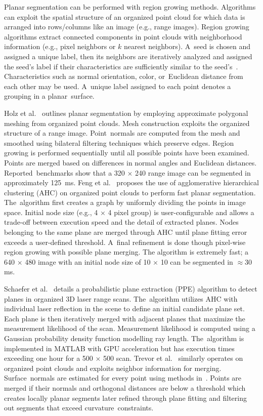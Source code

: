 Planar segmentation can be performed with region growing methods.  Algorithms can exploit the spatial structure of an organized point cloud for which data is arranged into rows/columns like an image (e.g., range images).  Region growing algorithms extract connected components in point clouds with neighborhood information (e.g., pixel neighbors or $k$ nearest neighbors). A~seed is chosen and assigned a unique label, then its neighbors are iteratively analyzed and assigned the seed’s label if their characteristics are sufficiently similar to the seed's~\cite{kaiser_survey_2019}. Characteristics such as normal orientation, color, or~Euclidean distance from each other may be used. A~unique label assigned to each point denotes a grouping in a planar~surface.

Holz et al.~\cite{lee_fast_2013} outlines planar segmentation by employing approximate polygonal meshing from organized point clouds. Mesh construction exploits the organized structure of a range image. Point~normals are computed from the mesh and smoothed using bilateral filtering techniques which preserve edges. Region growing is performed sequentially until all possible points have been examined. Points are merged based on differences in normal angles and Euclidean distances. Reported~benchmarks show that a 320 $\times$ 240 range image can be segmented in approximately 125~ms. 
Feng et al.~\cite{feng_fast_2014} proposes the use of agglomerative hierarchical clustering (AHC) on organized point clouds to perform fast planar segmentation.  The~algorithm first creates a graph by uniformly dividing the points in image space. Initial node size (e.g., 4 $\times$ 4 pixel group) is user-configurable and allows a trade-off between execution speed and the detail of extracted planes. Nodes belonging to the same plane are merged through AHC until plane fitting error exceeds a user-defined threshold. A~final refinement is done though pixel-wise region growing with possible plane merging.  The algorithm is extremely fast; a 640 $\times$ 480 image with an initial node size of 10 $\times$ 10 can be segmented in $\approx$30 ms.

Schaefer et al.~\cite{schaefer_maximum_2019} details a probabilistic plane extraction (PPE) algorithm to detect planes in organized 3D laser range scans. The~algorithm utilizes AHC with individual laser reflection in the scene to define an initial candidate plane set. Each plane is then iteratively merged with adjacent planes that maximize the measurement likelihood of the scan. Measurement likelihood is computed using a Gaussian probability density function modelling ray length. The~algorithm is implemented in MATLAB with GPU acceleration but has execution times exceeding one hour for a 500 $\times$ 500 scan.  Trevor et al.~\cite{trevor2013efficient} similarly operates on organized point clouds and exploits neighbor information for merging. Surface~normals are estimated for every point using methods in~\cite{lee_fast_2013}.  Points are merged if their normals and orthogonal distances are below a threshold which creates locally planar segments later refined through plane fitting and filtering out segments that exceed curvature~constraints.

